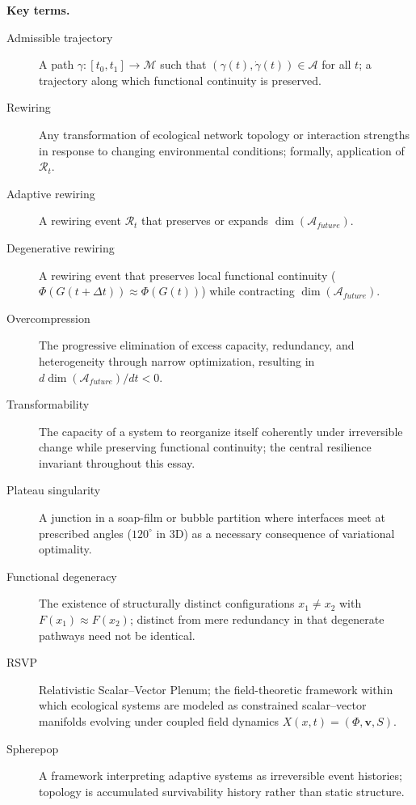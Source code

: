 \documentclass[11pt,a4paper]{article}
\newcommand{\Aspace}{\mathcal{A}}
\newcommand{\Mspace}{\mathcal{M}}
\newcommand{\vfield}{\mathbf{v}}
\begin{document}
\medskip
\noindent\textbf{Key terms.}
\begin{description}
  \item[Admissible trajectory] A path $\gamma:[t_0,t_1]\to\Mspace$ such that $(\gamma(t),\dot\gamma(t))\in\Aspace$ for all $t$; a trajectory along which functional continuity is preserved.
  \item[Rewiring] Any transformation of ecological network topology or interaction strengths in response to changing environmental conditions; formally, application of $\mathcal{R}_t$.
  \item[Adaptive rewiring] A rewiring event $\mathcal{R}_t$ that preserves or expands $\dim(\Aspace_{future})$.
  \item[Degenerative rewiring] A rewiring event that preserves local functional continuity ($\Phi(G(t+\Delta t))\approx\Phi(G(t))$) while contracting $\dim(\Aspace_{future})$.
  \item[Overcompression] The progressive elimination of excess capacity, redundancy, and heterogeneity through narrow optimization, resulting in $d\dim(\Aspace_{future})/dt<0$.
  \item[Transformability] The capacity of a system to reorganize itself coherently under irreversible change while preserving functional continuity; the central resilience invariant throughout this essay.
  \item[Plateau singularity] A junction in a soap-film or bubble partition where interfaces meet at prescribed angles ($120^\circ$ in 3D) as a necessary consequence of variational optimality.
  \item[Functional degeneracy] The existence of structurally distinct configurations $x_1\neq x_2$ with $F(x_1)\approx F(x_2)$; distinct from mere redundancy in that degenerate pathways need not be identical.
  \item[RSVP] Relativistic Scalar--Vector Plenum; the field-theoretic framework within which ecological systems are modeled as constrained scalar--vector manifolds evolving under coupled field dynamics $X(x,t)=(\Phi,\vfield,S)$.
  \item[Spherepop] A framework interpreting adaptive systems as irreversible event histories; topology is accumulated survivability history rather than static structure.
\end{description}


\newpage
\end{document}
